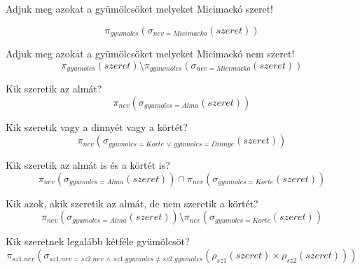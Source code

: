 \documentclass[a4paper,12pt]{article}
\theoremstyle{definition}
\begin{document}
\begin{exercise}
	Adjuk meg azokat a gyümölcsöket melyeket Micimackó szeret!
	
	\[
	\pi_{gyumolcs}{\left(  \sigma_{nev = Micimacko}{\left( szeret  \right) }\right) }
	\]
\end{exercise}

\begin{exercise}
Adjuk meg azokat a gyümölcsöket melyeket Micimackó nem szeret!
	\[
	\pi_{gyumolcs}{\left( szeret \right)} \setminus \pi_{gy\ddot{u}umolcs}{\left(  \sigma_{nev = Micimacko}{\left( szeret  \right) }\right) }
	\]
\end{exercise}

\begin{exercise}
	Kik szeretik az almát?
	\[
	\pi_{nev}(\sigma_{gyumolcs = Alma}(szeret))
	\]
\end{exercise}
\newpage
\begin{exercise}
	\begin{tasks}
	\end{tasks}
\end{exercise}

\begin{exercise}
	Kik szeretik vagy a dinnyét vagy a körtét?
	\[
	\pi_{nev}(\sigma_{gyumolcs = Korte \, \lor \, gyumolcs = Dinnye}(szeret))
	\]
\end{exercise}

\begin{exercise}
	Kik szeretik az almát is és a körtét is?
	\[
	\pi_{nev}(\sigma_{gyumolcs = Alma}(szeret)) \cap \pi_{nev}(\sigma_{gyumolcs = Korte}(szeret))
	\]
\end{exercise}

\begin{exercise}
	Kik azok, akik szeretik az almát, de nem szeretik a körtét?
	\[
	\pi_{nev}(\sigma_{gyumolcs = Alma}(szeret)) \setminus \pi_{nev}(\sigma_{gyumolcs = Korte}(szeret))
	\]
\end{exercise}

\begin{exercise}
	Kik szeretnek legalább kétféle gyümölcsöt?
	\[
	\pi_{sz1.nev}\left(\sigma_{sz1.nev = sz2.nev \, \land \, sz1.gyumolcs \ne sz2.gyumolcs}{ \left( \rho_{sz1}\left(szeret \right) \times \rho_{sz2} \left( szeret \right) \right) }\right)
	\]
\end{exercise}
\end{document}
